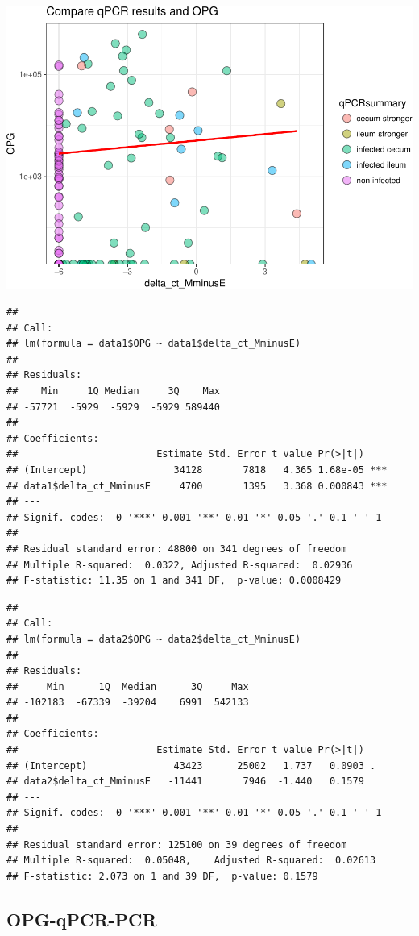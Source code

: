 \documentclass[]{article}
\begin{document}
\includegraphics{Data_Analysis_Alice_files/figure-latex/opgqpcr-1.pdf}

\begin{verbatim}
## 
## Call:
## lm(formula = data1$OPG ~ data1$delta_ct_MminusE)
## 
## Residuals:
##    Min     1Q Median     3Q    Max 
## -57721  -5929  -5929  -5929 589440 
## 
## Coefficients:
##                        Estimate Std. Error t value Pr(>|t|)    
## (Intercept)               34128       7818   4.365 1.68e-05 ***
## data1$delta_ct_MminusE     4700       1395   3.368 0.000843 ***
## ---
## Signif. codes:  0 '***' 0.001 '**' 0.01 '*' 0.05 '.' 0.1 ' ' 1
## 
## Residual standard error: 48800 on 341 degrees of freedom
## Multiple R-squared:  0.0322, Adjusted R-squared:  0.02936 
## F-statistic: 11.35 on 1 and 341 DF,  p-value: 0.0008429
\end{verbatim}

\begin{verbatim}
## 
## Call:
## lm(formula = data2$OPG ~ data2$delta_ct_MminusE)
## 
## Residuals:
##     Min      1Q  Median      3Q     Max 
## -102183  -67339  -39204    6991  542133 
## 
## Coefficients:
##                        Estimate Std. Error t value Pr(>|t|)  
## (Intercept)               43423      25002   1.737   0.0903 .
## data2$delta_ct_MminusE   -11441       7946  -1.440   0.1579  
## ---
## Signif. codes:  0 '***' 0.001 '**' 0.01 '*' 0.05 '.' 0.1 ' ' 1
## 
## Residual standard error: 125100 on 39 degrees of freedom
## Multiple R-squared:  0.05048,    Adjusted R-squared:  0.02613 
## F-statistic: 2.073 on 1 and 39 DF,  p-value: 0.1579
\end{verbatim}

\subsection{OPG-qPCR-PCR}\label{opg-qpcr-pcr}
\end{document}
